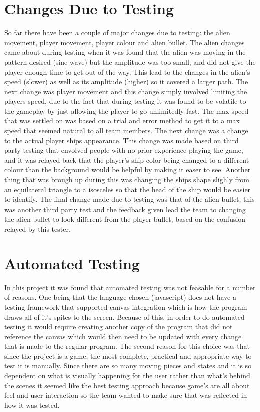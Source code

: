 \documentclass[12pt, titlepage]{article}
\begin{document}
\section{Changes Due to Testing}
So far there have been a couple of major changes due to testing: the alien movement, player movement, player colour and alien bullet. The alien changes came about during testing when it was found that the alien was moving in the pattern desired (sine wave) but the amplitude was too small, and did not give the player enough time to get out of the way. This lead  to the changes in the alien's speed (slower) as well as its amplitude (higher) so it covered a larger path. The next change was player movement and this change simply involved limiting the players speed, due to the fact that during testing it was found to be volatile to the gameplay by just allowing the player to go unlimitedly fast. The max speed that was settled on was based on a trial and error method to get it to a max speed that seemed natural to all team members. The next change was a change to the actual player ships appearance. This change was made based on third party testing that envolved people with no prior experience playing the game, and it was relayed back that the player's ship color being changed to a different colour than the background would be helpful by making it easer to see. Another thing that was brough up during this was changing the ships shape slighly from an equilateral triangle to a isosceles so that the head of the ship would be easier to identify. The final change made due to testing was that of the alien bullet, this was another third party test and the feedback given lead the team to changing the alien bullet to look  different from the player bullet, based on the confusion relayed by this tester.

\section{Automated Testing}
In this project it was found that automated testing was not feasable for a number of reasons. One being that the language chosen (javascript) does not have a testing framework that supported canvas integration which is how the program draws all of it's spites to the screen. Because of this, in order to do automated testing it would require creating another copy of the program that did not reference the canvas which would then need to be updated with every change that is made to the regular program. The second reason for this choice was that since the project is a game, the most complete, practical and appropriate way to test it is manually. Since there are so many moving pieces and states and it is so dependent on what is visually happening for the user rather than what's behind the scenes it seemed like the best testing approach because game's are all about feel and user interaction so the team wanted to make sure that was reflected in how it was tested.
\end{document}
